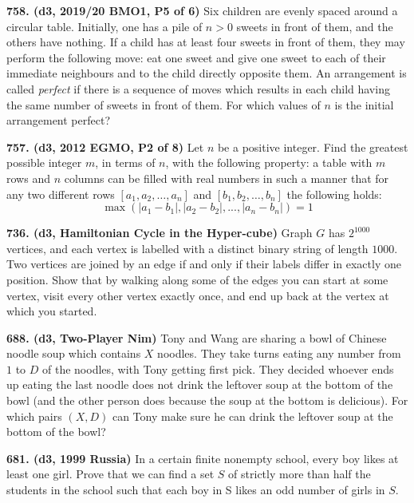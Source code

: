 \documentclass{article}
\begin{document}
        \textbf{758. (\color{red}d3\color{black}, 2019/20 BMO1, P5 of 6)} Six children are evenly spaced around a circular table. Initially, one has a pile of $n>0$ sweets in front of them, and the others have nothing. If a child has at least four sweets in front of them, they may perform the following move: eat one sweet and give one sweet to each of their immediate neighbours and to the child directly opposite them. An arrangement is called \textit{perfect} if there is a sequence of moves which results in each child having the same number of sweets in front of them. For which values of $n$ is the initial arrangement perfect?

        \textbf{757. (\color{red}d3\color{black}, 2012 EGMO, P2 of 8)} Let $n$ be a positive integer. Find the greatest possible integer $m$, in terms of $n$, with the following property: a table with $m$ rows and $n$ columns can be filled with real numbers in such a manner that for any two different rows $\left[ {{a_1},{a_2},\ldots,{a_n}}\right]$ and $\left[ {{b_1},{b_2},\ldots,{b_n}} \right]$ the following holds: \[\max\left( {\left| {{a_1} - {b_1}} \right|,\left| {{a_2} - {b_2}} \right|,...,\left| {{a_n} - {b_n}} \right|} \right) = 1\]

        \textbf{736. (\color{red}d3\color{black}, Hamiltonian Cycle in the Hyper-cube)} Graph $G$ has $2^{1000}$ vertices, and each vertex is labelled with a distinct binary string of length $1000.$ Two vertices are joined by an edge if and only if their labels differ in exactly one position. Show that by walking along some of the edges you can start at some vertex, visit every other vertex exactly once, and end up back at the vertex at which you started.

        \textbf{688. (\color{red}d3\color{black}, Two-Player Nim)} Tony and Wang are sharing a bowl of Chinese noodle soup which contains $X$ noodles. They take turns eating any number from $1$ to $D$ of the noodles, with Tony getting first pick. They decided whoever ends up eating the last noodle does not drink the leftover soup at the bottom of the bowl (and the other person does because the soup at the bottom is delicious). For which pairs $(X, D)$ can Tony make sure he can drink the leftover soup at the bottom of the bowl?

        \textbf{681. (\color{red}d3\color{black}, 1999 Russia)} In a certain finite nonempty school, every boy likes at least one girl. Prove that we can find a set $S$ of strictly more than half the students in the school such that each boy in S likes an odd number of girls in $S$.
\end{document}
